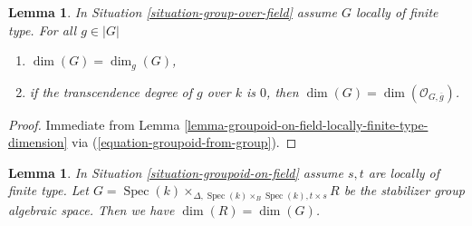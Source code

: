 \documentclass{stacks-project}
\theoremstyle{plain}
\newtheorem{lemma}[subsection]{Lemma}
\theoremstyle{definition}
\theoremstyle{remark}
\numberwithin{equation}{subsection}
\def\Spec{\mathop{\mathrm{Spec}}}
\begin{document}
\begin{lemma}
\label{lemma-group-over-field-locally-finite-type-dimension}
In
Situation \ref{situation-group-over-field}
assume $G$ locally of finite type.
For all $g \in |G|$
\begin{enumerate}
\item $\dim(G) = \dim_g(G)$,
\item if the transcendence degree of $g$ over $k$ is $0$, then
$\dim(G) = \dim(\mathcal{O}_{G, \overline{g}})$.
\end{enumerate}
\end{lemma}

\begin{proof}
Immediate from
Lemma \ref{lemma-groupoid-on-field-locally-finite-type-dimension}
via (\ref{equation-groupoid-from-group}).
\end{proof}

\begin{lemma}
\label{lemma-groupoid-on-field-dimension-equal-stabilizer}
In
Situation \ref{situation-groupoid-on-field}
assume $s, t$ are locally of finite type.
Let
$G = \Spec(k)
\times_{\Delta, \Spec(k) \times_B \Spec(k), t \times s} R$
be the stabilizer group algebraic space.
Then we have $\dim(R) = \dim(G)$.
\end{lemma}
\end{document}
